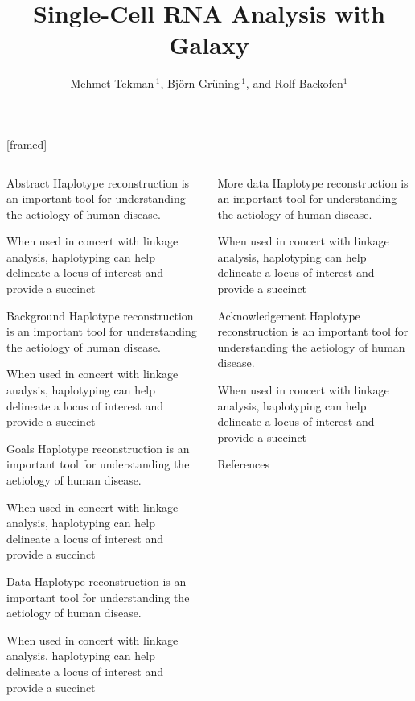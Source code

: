 \documentclass{beamer}
\title[Single Cell]{Single-Cell RNA Analysis with Galaxy}
\author{Mehmet Tekman\,$^{1}$, Bj{\"o}rn Gr{\"u}ning\,$^{1}$, and Rolf Backofen$^{1}$}
\institute[Backofen]{$^{1}$Albert-Ludwigs-University Freiburg, Department of Computer Science,\\Backofen Bioinformatics Group, Georges-K{\"o}hler-Allee 106, 79110 Freiburg}
\begin{document}
[framed]
\begin{frame}
\begin{columns}
	\begin{column}{.47\textwidth}
		\begin{block}{Abstract}
Haplotype reconstruction is an important tool for understanding the aetiology of human disease. 

When used in concert with linkage analysis, haplotyping can help delineate a locus of interest and provide a succinct 
		\end{block}

		\begin{block}{Background}
Haplotype reconstruction is an important tool for understanding the aetiology of human disease. 

When used in concert with linkage analysis, haplotyping can help delineate a locus of interest and provide a succinct 
		\end{block}

		\begin{block}{Goals}
Haplotype reconstruction is an important tool for understanding the aetiology of human disease. 

When used in concert with linkage analysis, haplotyping can help delineate a locus of interest and provide a succinct 
		\end{block}

		\begin{block}{Data}
Haplotype reconstruction is an important tool for understanding the aetiology of human disease. 

When used in concert with linkage analysis, haplotyping can help delineate a locus of interest and provide a succinct 
		\end{block}
	\end{column}
	\begin{column}{.47\textwidth}
		\begin{block}{More data}
Haplotype reconstruction is an important tool for understanding the aetiology of human disease. 

When used in concert with linkage analysis, haplotyping can help delineate a locus of interest and provide a succinct 
		\end{block}

		\begin{block}{Acknowledgement}
Haplotype reconstruction is an important tool for understanding the aetiology of human disease. 

When used in concert with linkage analysis, haplotyping can help delineate a locus of interest and provide a succinct 
		\end{block}
		\begin{block}{References}
			\fontsize{14}{10}\selectfont
			
		\end{block}
	\end{column}
\end{columns}
\end{frame}
\end{document}
